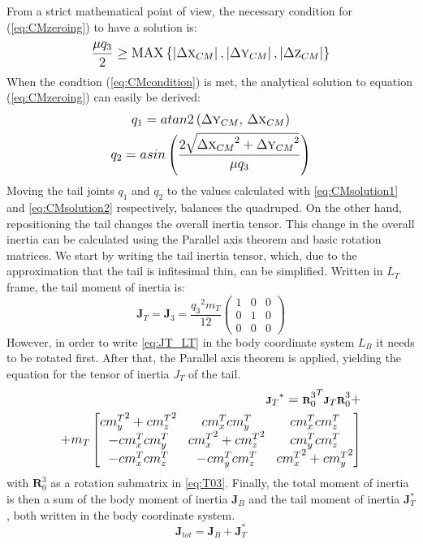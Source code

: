 From a strict mathematical point of view, the necessary condition for (\ref{eq:CMzeroing}) to have a solution is:
\begin{equation}\label{eq:CMcondition}
\frac{\mu q_3}{2}\geq \textup{MAX}\left \{ \left | \Delta \textsc{x}_{CM} \right |, \left | \Delta \textsc{y}_{CM} \right |,\left | \Delta \textsc{z}_{CM} \right |\right \}
\end{equation}
When the condtion (\ref{eq:CMcondition}) is met, the analytical solution to equation (\ref{eq:CMzeroing}) can easily be derived:
\begin{gather}\label{eq:CMsolution1}
q_1=atan2\left({\Delta \textsc{y}_{CM}},\, {\Delta \textsc{x}_{CM}}\right)\\
q_2=asin\left(\frac{2\sqrt{{\Delta \textsc{x}_{CM}}^2+{\Delta \textsc{y}_{CM}}^2}}{\mu q_3} \right)\label{eq:CMsolution2}
\end{gather}
Moving the tail joints $q_1$ and $q_2$ to the values calculated with \eqref{eq:CMsolution1} and \eqref{eq:CMsolution2} respectively, balances the quadruped. On the other hand, repositioning the tail changes the overall inertia tensor. This change in the overall inertia can be calculated using the Parallel axis theorem and basic rotation matrices. We start by writing the tail inertia tensor, which, due to the approximation that the tail is infitesimal thin, can be simplified. Written in $L_T$ frame, the tail moment of inertia is:
\begin{equation}\label{eq:JT_LT}
\textbf{J}_T=\textbf{J}_3=\frac{{q_3}^2 m_T}{12}\left(
\begin{array}{ccc}
 1 & 0 & 0 \\
 0 & 1 & 0 \\
 0 & 0 & 0
\end{array}
\right)
\end{equation}
However, in order to write \eqref{eq:JT_LT} in the body coordinate system $L_B$ it needs to be rotated first. After that, the Parallel axis theorem is applied, yielding the equation for the tensor of inertia $J_T$ of the tail. 
\begin{equation}
\begin{aligned}
\scriptsize
{\textbf{J}_T}^*={\textbf{R}_0^3}^T\textbf{J}_T\textbf{R}_0^3+\\+m_T\begin{bmatrix}
{cm_y^T}^2 +{cm_z^T}^2& {cm_x^T}{cm_y^T}& {cm_x^T}{cm_z^T} \\ 
-{cm_x^T}{cm_y^T} & {cm_x^T}^2+{cm_z^T}^2 & {cm_y^T}{cm_z^T}\\ 
-{cm_x^T}{cm_z^T} & -{cm_y^T}{cm_z^T} & {cm_x^T}^2+{cm_y^T}^2
\end{bmatrix}
\normalsize
\end{aligned}
\end{equation}
with $\textbf{R}_0^3$ as a rotation submatrix in \eqref{eq:T03}. Finally, the total moment of inertia is then a sum of the body moment of inertia $\textbf{J}_B$ and the tail moment of inertia $\textbf{J}_T^*$, both written in the body coordinate system.
\begin{equation*}
\textbf{J}_{tot}=\textbf{J}_B+\textbf{J}_T^*
\end{equation*}
